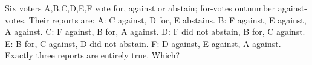 Six voters A,B,C,D,E,F vote for, against or abstain; for-votes outnumber against-votes. Their reports are: A: C against, D for, E abstains. B: F against, E against, A against. C: F against, B for, A against. D: F did not abstain, B for, C against. E: B for, C against, D did not abstain. F: D against, E against, A against. Exactly three reports are entirely true. Which?
